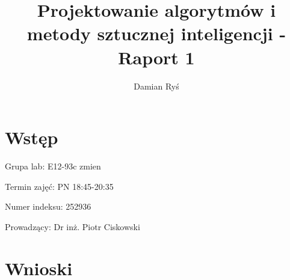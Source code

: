 \documentclass{article}
\title{Projektowanie algorytmów i metody sztucznej inteligencji - Raport 1}
\author{Damian Ryś}
\begin{document}
\maketitle


\tableofcontents
\section{Wstęp}
Grupa lab: E12-93c zmien	

Termin zajęć: PN 18:45-20:35

Numer indeksu: 252936

Prowadzący: Dr inż. Piotr Ciskowski 

\section{Wnioski}
\end{document}
